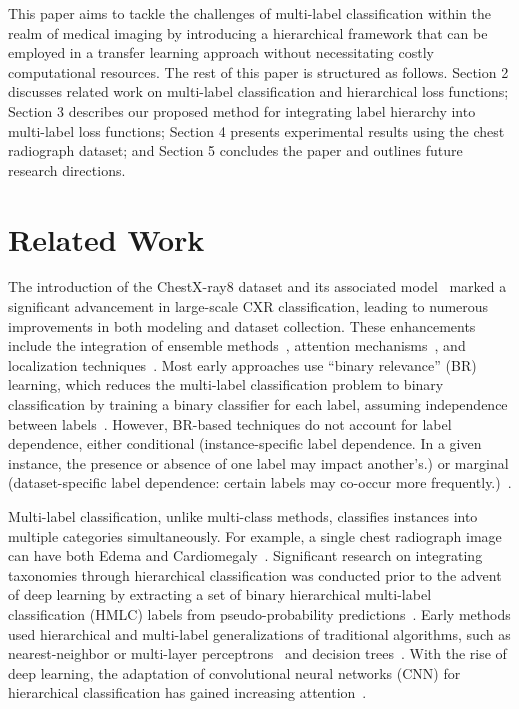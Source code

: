 This paper aims to tackle the challenges of multi-label classification within the realm of medical imaging by introducing a hierarchical framework that can be employed in a transfer learning approach without necessitating costly computational resources. The rest of this paper is structured as follows. Section 2 discusses related work on multi-label classification and hierarchical loss functions; Section 3 describes our proposed method for integrating label hierarchy into multi-label loss functions; Section 4 presents experimental results using the chest radiograph dataset; and Section 5 concludes the paper and outlines future research directions.

\section{Related Work}

The introduction of the ChestX-ray8 dataset and its associated model~\cite{wang_ChestXRay8_2017} marked a significant advancement in large-scale CXR classification, leading to numerous improvements in both modeling and dataset collection. These enhancements include the integration of ensemble methods~\cite{islam_Abnormality_2017}, attention mechanisms~\cite{guan_Diagnose_2018,liu_SDFN_2019}, and localization techniques~\cite{cai_Iterative_2018,guendel_MultiTask_2019,li_Thoracic_2018,yan_Weakly_2018}. Most early approaches use ``binary relevance'' (BR) learning, which reduces the multi-label classification problem to binary classification by training a binary classifier for each label, assuming independence between labels~\cite{zhang_Review_2014}. However, BR-based techniques do not account for label dependence, either conditional (instance-specific label dependence. In a given instance, the presence or absence of one label may impact another's.) or marginal (dataset-specific label dependence: certain labels may co-occur more frequently.)~\cite{dembczynski_Label_2012}.

Multi-label classification, unlike multi-class methods, classifies instances into multiple categories simultaneously. For example, a single chest radiograph image can have both Edema and Cardiomegaly~\cite{harvey_Standardised_2019,tsoumakas_MultiLabel_2007}. Significant research on integrating taxonomies through hierarchical classification was conducted prior to the advent of deep learning by extracting a set of binary hierarchical multi-label classification (HMLC) labels from pseudo-probability predictions~\cite{bi_BayesOptimal_2015}. Early methods used hierarchical and multi-label generalizations of traditional algorithms, such as nearest-neighbor or multi-layer perceptrons~\cite{pourghassem_ContentBased_2008} and decision trees~\cite{dimitrovski_Hierarchical_2011}. With the rise of deep learning, the adaptation of convolutional neural networks (CNN) for hierarchical classification has gained increasing attention~\cite{guo_CNNRNN_2018,kowsari_HDLTex_2017,redmon_YOLO9000_2017,roy_TreeCNN_2020}.

